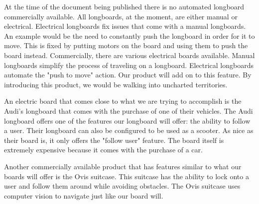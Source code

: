 


At the time of the document being published there is no automated longboard commercially available. All longboards, at the moment, are either manual or electrical. Electrical longboards fix issues that come with a manual longboards. An example would be the need to constantly push the longboard in order for it to move. This is fixed by putting motors on the board and using them to push the board instead. Commercially, there are various electrical boards available\cite{Petrovan2021}. Manual longboards simplify the process of traveling on a longboard. Electrical longboards automate the "push to move" action. Our product will add on to this feature. By introducing this product, we would be walking into uncharted territories. 

An electric board that comes close to what we are trying to accomplish is the Audi's longboard that comes with the purchase of one of their vehicles. The Audi longboard offers one of the features our longboard will offer: the ability to follow a user\cite{Fox2016}. Their longboard can also be configured to be used as a scooter. As nice as their board is, it only offers the "follow user" feature. The board itself is extremely expensive because it comes with the purchase of a car.

Another commercially available product that has features similar to what our boards will offer is the Ovis suitcase. This suitcase has the ability to lock onto a user and follow them around while avoiding obstacles\cite{Henry2018}. The Ovis suitcase uses computer vision to navigate just like our board will.

